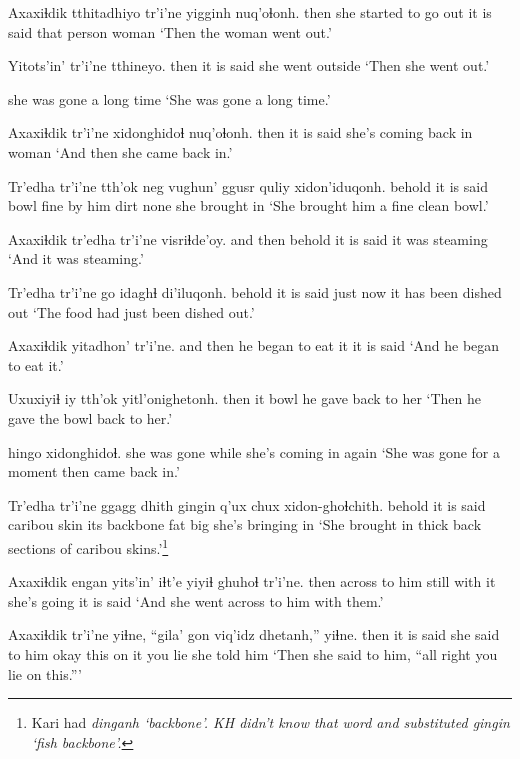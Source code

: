 \documentclass[12pt]{article}
\begin{document}
\gll Axaxiɬdik tthitadhiyo tr'i'ne yigginh nuq'oɬonh.
then  {she started to go out} {it is said} {that person}  woman
\glt `Then the woman went out.'
\glend

\gll Yitots'in' tr'i'ne tthineyo.
then  {it is said} {she went outside}
\glt `Then she went out.'
\glend

{{she was gone a long time}}
\glt `She was gone a long time.'
\glend

\gll Axaxiɬdik tr'i'ne xidonghidoɬ nuq'oɬonh.
then  {it is said} {she's coming back in} woman
\glt `And then she came back in.'
\glend

\gll Tr'edha tr'i'ne  tth'ok  neg vughun' ggusr quliy xidon'iduqonh.
behold  {it is said} bowl  fine {by him}  dirt none {she brought in}
\glt `She brought him a fine clean bowl.'
\glend

\gll Axaxiɬdik tr'edha tr'i'ne visriɬde'oy.
{and then} behold {it is said} {it was steaming}
\glt `And it was steaming.'
\glend

\gll Tr'edha tr'i'ne {go idaghɬ} di'iluqonh.
behold  {it is said} {just now} {it has been dished out}
\glt `The food had just been dished out.'
\glend

\gll Axaxiɬdik yitadhon'  tr'i'ne.
{and then} {he began to eat it} {it is said}
\glt `And he began to eat it.'
\glend

\gll Uxuxiyiɬ iy tth'ok  yitl'onighetonh.
then  it bowl  {he gave back to her}
\glt `Then he gave the bowl back to her.'
\glend

 hingo xidonghidoɬ.
{she was gone}  while {she's coming in again}
\glt `She was gone for a moment then came back in.'
\glend

\gll Tr'edha tr'i'ne ggagg  dhith gingin q'ux chux xidon-ghoɬchith.
behold  {it is said} caribou  skin {its backbone} fat big {she's bringing in}
\glt `She brought in thick back sections of caribou skins.'\footnote{Kari had \em dinganh \em `backbone'. KH didn't know that word and substituted \em gingin `fish backbone'.}
\glend

\gll Axaxiɬdik engan yits'in'  iɬt'e yiyiɬ ghuhoɬ  tr'i'ne.
then  across {to him}  still {with it} {she's going}  {it is said}
\glt `And she went across to him with them.'
\glend

\gll Axaxiɬdik tr'i'ne yiɬne,   ``gila' gon viq'idz dhetanh,'' yiɬne.
then  {it is said} {she said to him} okay this {on it} {you lie} {she told him}
\glt `Then she said to him, ``all right you lie on this.'''
\glend
\end{document}

